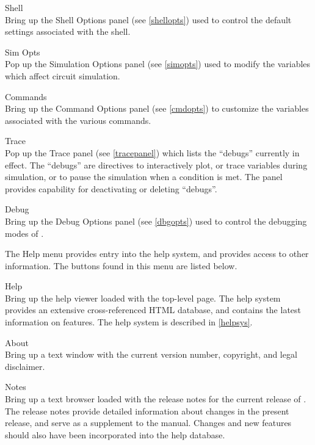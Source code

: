 \begin{description}
\item{\cb Shell}\\
Bring up the {\cb Shell Options} panel (see \ref{shellopts}) used to
control the default settings associated with the {\WRspice} shell.

\item{\cb Sim Opts}\\
Pop up the {\cb Simulation Options} panel (see \ref{simopts}) used
to modify the variables which affect circuit simulation.

\item{\cb Commands}\\
Bring up the {\cb Command Options} panel (see \ref{cmdopts}) to
customize the variables associated with the various commands.

\item{\cb Trace}\\
Pop up the {\cb Trace} panel (see \ref{tracepanel}) which lists the
``debugs'' currently in effect.  The ``debugs'' are directives to
interactively plot, or trace variables during simulation, or to pause
the simulation when a condition is met.  The panel provides capability
for deactivating or deleting ``debugs''.

\item{\cb Debug}\\
Bring up the {\cb Debug Options} panel (see \ref{dbgopts}) used to
control the debugging modes of {\WRspice}.
\end{description}

The {\cb Help} menu provides entry into the help system, and provides
access to other information.  The buttons found in this menu are listed
below.

\begin{description}
\item{\cb Help}\\
Bring up the help viewer loaded with the top-level page.  The help
system provides an extensive cross-referenced HTML database, and
contains the latest information on {\WRspice} features.  The help
system is described in \ref{helpsys}.

\item{\cb About}\\
Bring up a text window with the current {\WRspice} version number,
copyright, and legal disclaimer.

\item{\cb Notes}\\
Bring up a text browser loaded with the release notes for the current
release of {\WRspice}.  The release notes provide detailed information
about changes in the present release, and serve as a supplement to the
manual.  Changes and new features should also have been incorporated
into the help database.
\end{description}

